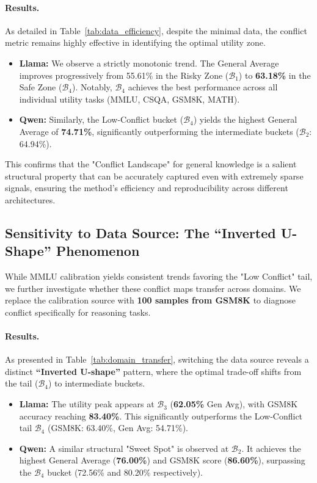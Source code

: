 \documentclass[11pt]{article}
\begin{document}
\paragraph{Results.} As detailed in Table~\ref{tab:data_efficiency}, despite the minimal data, the conflict metric remains highly effective in identifying the optimal utility zone.
\begin{itemize}
    \item \textbf{Llama:} We observe a strictly monotonic trend. The General Average improves progressively from 55.61\% in the Risky Zone ($\mathcal{B}_1$) to \textbf{63.18\%} in the Safe Zone ($\mathcal{B}_4$). Notably, $\mathcal{B}_4$ achieves the best performance across all individual utility tasks (MMLU, CSQA, GSM8K, MATH).
    \item \textbf{Qwen:} Similarly, the Low-Conflict bucket ($\mathcal{B}_4$) yields the highest General Average of \textbf{74.71\%}, significantly outperforming the intermediate buckets ($\mathcal{B}_2$: 64.94\%).
\end{itemize}
This confirms that the "Conflict Landscape" for general knowledge is a salient structural property that can be accurately captured even with extremely sparse signals, ensuring the method's efficiency and reproducibility across different architectures.

\subsection{Sensitivity to Data Source: The ``Inverted U-Shape'' Phenomenon}
\label{sec:domain_transfer}

While MMLU calibration yields consistent trends favoring the "Low Conflict" tail, we further investigate whether these conflict maps transfer across domains. We replace the calibration source with \textbf{100 samples from GSM8K} to diagnose conflict specifically for reasoning tasks.

\paragraph{Results.} As presented in Table~\ref{tab:domain_transfer}, switching the data source reveals a distinct \textbf{``Inverted U-shape''} pattern, where the optimal trade-off shifts from the tail ($\mathcal{B}_4$) to intermediate buckets.
\begin{itemize}
    \item \textbf{Llama:} The utility peak appears at $\mathcal{B}_3$ (\textbf{62.05\%} Gen Avg), with GSM8K accuracy reaching \textbf{83.40\%}. This significantly outperforms the Low-Conflict tail $\mathcal{B}_4$ (GSM8K: 63.40\%, Gen Avg: 54.71\%).
    \item \textbf{Qwen:} A similar structural "Sweet Spot" is observed at $\mathcal{B}_2$. It achieves the highest General Average (\textbf{76.00\%}) and GSM8K score (\textbf{86.60\%}), surpassing the $\mathcal{B}_4$ bucket (72.56\% and 80.20\% respectively).
\end{itemize}
\end{document}
